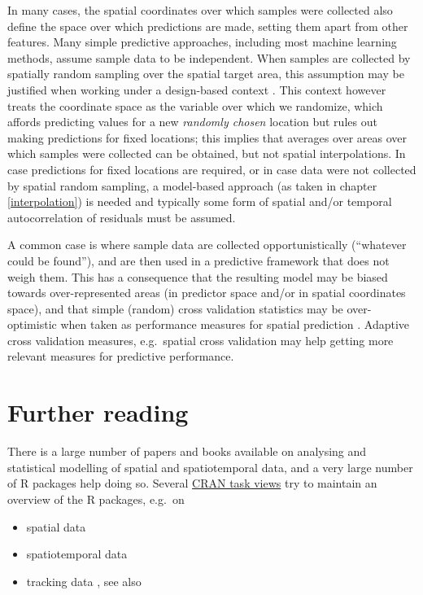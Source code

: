 \documentclass[]{book}
\providecommand{\tightlist}{%
  \setlength{\itemsep}{0pt}\setlength{\parskip}{0pt}}
\begin{document}
In many cases, the spatial coordinates over which samples were
collected also define the space over which predictions are made,
setting them apart from other features. Many simple predictive
approaches, including most machine learning methods, assume
sample data to be independent. When samples are collected by
spatially random sampling over the spatial target area, this
assumption may be justified when working under a design-based context
\citep{brusejss}. This context however treats the coordinate space as
the variable over which we randomize, which affords predicting
values for a new \emph{randomly chosen} location but rules out making
predictions for fixed locations; this implies that averages over
areas over which samples were collected can be obtained, but not
spatial interpolations. In case predictions for fixed locations
are required, or in case data were not collected by spatial
random sampling, a model-based approach (as taken in chapter
\ref{interpolation}) is needed and typically some form of spatial
and/or temporal autocorrelation of residuals must be assumed.

A common case is where sample data are collected opportunistically
(``whatever could be found''), and are then used in a predictive
framework that does not weigh them. This has a consequence that the
resulting model may be biased towards over-represented areas (in
predictor space and/or in spatial coordinates space), and that simple
(random) cross validation statistics may be over-optimistic when
taken as performance measures for spatial prediction \citep{meyerpebesma}.
Adaptive cross validation measures, e.g.~spatial cross validation
may help getting more relevant measures for predictive performance.

\hypertarget{further-reading}{%
\section{Further reading}\label{further-reading}}

There is a large number of papers and books available on analysing
and statistical modelling of spatial and spatiotemporal data, and
a very large number of R packages help doing so. Several \href{https://cran.r-project.org/web/views/}{CRAN task
views} try to maintain an
overview of the R packages, e.g.~on

\begin{itemize}
\tightlist
\item
  spatial data \citep{ctvspatial}
\item
  spatiotemporal data \citep{ctvspatiotemporal}
\item
  tracking data \citep{ctvtracking}, see also \citep{https://doi.org/10.1111/1365-2656.13116}
\end{itemize}
\end{document}
